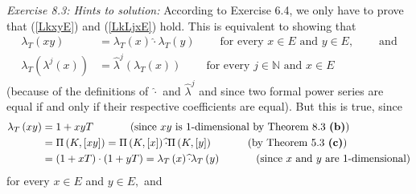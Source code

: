 \documentclass[numbers=enddot,12pt,final,onecolumn,notitlepage]{scrartcl}%
\begin{document}
\textit{Exercise 8.3: Hints to solution:} According to Exercise 6.4, we only
have to prove that (\ref{LkxyE}) and (\ref{LkLjxE}) hold. This is equivalent
to showing that%
\begin{align*}
\lambda_{T}\left(  xy\right)   &  =\lambda_{T}\left(  x\right)  \widehat{\cdot
}\lambda_{T}\left(  y\right)  \ \ \ \ \ \ \ \ \ \ \text{for every }x\in
E\text{ and }y\in E,\ \ \ \ \ \ \ \ \ \ \text{and}\\
\lambda_{T}\left(  \lambda^{j}\left(  x\right)  \right)   &  =\widehat{\lambda
}^{j}\left(  \lambda_{T}\left(  x\right)  \right)
\ \ \ \ \ \ \ \ \ \ \text{for every }j\in\mathbb{N}\text{ and }x\in E
\end{align*}
(because of the definitions of $\widehat{\cdot}$ and $\widehat{\lambda}^{j}$
and since two formal power series are equal if and only if their respective
coefficients are equal). But this is true, since%
\begin{align*}
\lambda_{T}\left(  xy\right)   &  =1+xyT\ \ \ \ \ \ \ \ \ \ \left(
\text{since }xy\text{ is }1\text{-dimensional by Theorem 8.3 \textbf{(b)}%
}\right) \\
&  =\Pi\left(  K,\left[  xy\right]  \right)  =\Pi\left(  K,\left[  x\right]
\right)  \widehat{\cdot}\Pi\left(  K,\left[  y\right]  \right)
\ \ \ \ \ \ \ \ \ \ \left(  \text{by Theorem 5.3 \textbf{(c)}}\right) \\
&  =\left(  1+xT\right)  \cdot\left(  1+yT\right)  =\lambda_{T}\left(
x\right)  \widehat{\cdot}\lambda_{T}\left(  y\right)
\ \ \ \ \ \ \ \ \ \ \left(  \text{since }x\text{ and }y\text{ are
}1\text{-dimensional}\right)
\end{align*}
for every $x\in E$ and $y\in E,$ and%
\end{document}
